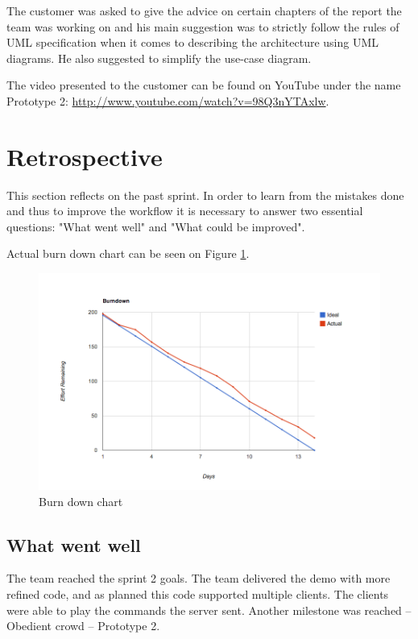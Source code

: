 The customer was asked to give the advice on certain chapters of the report the team was working on and his main suggestion was to strictly follow the rules of UML specification when it comes to describing the architecture using UML diagrams. He also suggested to simplify the use-case diagram.

The video presented to the customer can be found on YouTube under the name Prototype 2: \url{http://www.youtube.com/watch?v=98Q3nYTAxlw}.




\section{Retrospective}
This section reflects on the past sprint. In order to learn from the mistakes done and thus to improve the workflow it is necessary to answer two essential questions: "What went well" and "What could be improved".

Actual burn down chart can be seen on Figure \ref{fig:Burn2}.  

\begin{figure}[H]
	\centering
		\includegraphics[width=18cm]{sprint2/BurndownSprint2.png}
	\caption{Burn down chart}
	\label{fig:Burn2}
\end{figure}


\subsection{What went well}
The team reached the sprint 2 goals. 
The team delivered the demo with more refined code, and as planned this code supported multiple clients. 
The clients were able to play the commands the server sent.
Another milestone was reached -- Obedient crowd -- Prototype 2.

